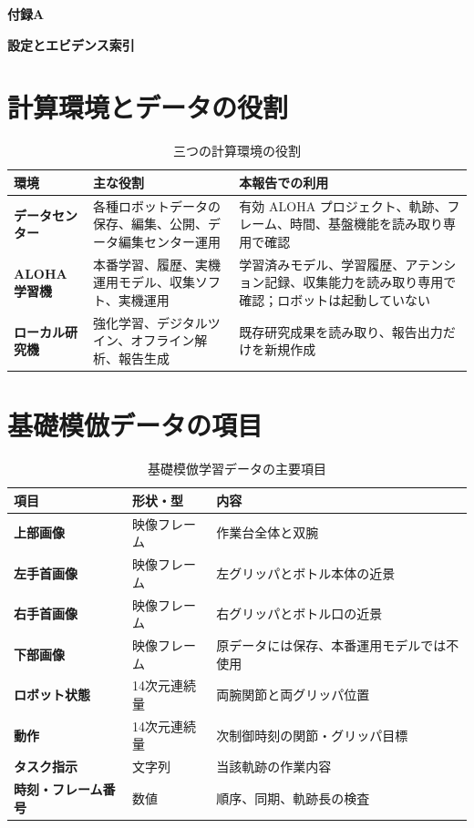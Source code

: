 \appendix
\clearpage
{}
{}
{\sffamily\bfseries\fontsize{22}{28}\selectfont 付録A\par}
\vspace{2mm}
{\sffamily\bfseries\fontsize{18}{24}\selectfont 設定とエビデンス索引\par}
\vspace{5mm}

\section{計算環境とデータの役割}

\begin{table}[H]
\centering
\caption{三つの計算環境の役割}
\begin{tabularx}{\textwidth}{>{\bfseries}p{34mm}p{42mm}X}
\toprule
環境 & 主な役割 & 本報告での利用\\
\midrule
データセンター & 各種ロボットデータの保存、編集、公開、データ編集センター運用 & 有効 ALOHA プロジェクト、軌跡、フレーム、時間、基盤機能を読み取り専用で確認\\
ALOHA 学習機 & 本番学習、履歴、実機運用モデル、収集ソフト、実機運用 & 学習済みモデル、学習履歴、アテンション記録、収集能力を読み取り専用で確認；ロボットは起動していない\\
ローカル研究機 & 強化学習、デジタルツイン、オフライン解析、報告生成 & 既存研究成果を読み取り、報告出力だけを新規作成\\
\bottomrule
\end{tabularx}
\end{table}

\section{基礎模倣データの項目}

\begin{table}[H]
\centering
\caption{基礎模倣学習データの主要項目}
\begin{tabularx}{\textwidth}{>{\bfseries}p{35mm}p{32mm}X}
\toprule
項目 & 形状・型 & 内容\\
\midrule
上部画像 & 映像フレーム & 作業台全体と双腕\\
左手首画像 & 映像フレーム & 左グリッパとボトル本体の近景\\
右手首画像 & 映像フレーム & 右グリッパとボトル口の近景\\
下部画像 & 映像フレーム & 原データには保存、本番運用モデルでは不使用\\
ロボット状態 & 14次元連続量 & 両腕関節と両グリッパ位置\\
動作 & 14次元連続量 & 次制御時刻の関節・グリッパ目標\\
タスク指示 & 文字列 & 当該軌跡の作業内容\\
時刻・フレーム番号 & 数値 & 順序、同期、軌跡長の検査\\
\bottomrule
\end{tabularx}
\end{table}

